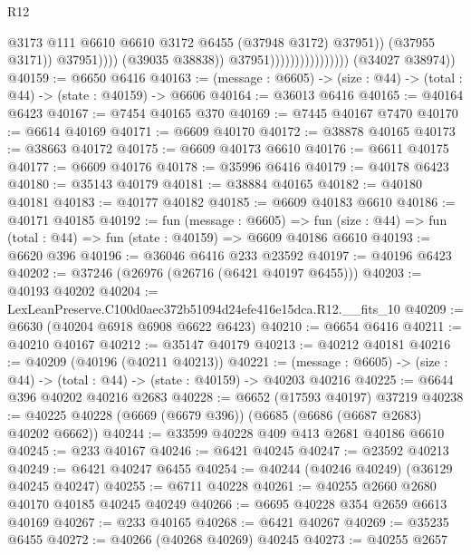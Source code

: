 \begin{lexlean}{R12}
\begin{coremodule}
                                                      @3173
                                                      @111
                                                      @6610
                                                      @6610
                                                      @3172
                                                      @6455
                                                      (@37948 @3172)
                                                      @37951))
                                                  (@37955 @3171))
                                                @37951))))
                                        (@39035 @38838))
                                      @37951))))))))))))))))
      (@34027 @38974))
@40159 := @6650 @6416
@40163 := (message : @6605) -> (size : @44) -> (total : @44) -> (state : @40159) -> @6606
@40164 := @36013 @6416
@40165 := @40164 @6423
@40167 := @7454 @40165 @370
@40169 := @7445 @40167 @7470
@40170 := @6614 @40169
@40171 := @6609 @40170
@40172 := @38878 @40165
@40173 := @38663 @40172
@40175 := @6609 @40173 @6610
@40176 := @6611 @40175
@40177 := @6609 @40176
@40178 := @35996 @6416
@40179 := @40178 @6423
@40180 := @35143 @40179
@40181 := @38884 @40165
@40182 := @40180 @40181
@40183 := @40177 @40182
@40185 := @6609 @40183 @6610
@40186 := @40171 @40185
@40192 := fun (message : @6605) =>
  fun (size : @44) => fun (total : @44) => fun (state : @40159) => @6609 @40186 @6610
@40193 := @6620 @396
@40196 := @36046 @6416 @233 @23592
@40197 := @40196 @6423
@40202 := @37246 (@26976 (@26716 (@6421 @40197 @6455)))
@40203 := @40193 @40202
@40204 := LexLeanPreserve.C100d0aec372b51094d24efe416e15dca.R12.__fits_10
@40209 := @6630 (@40204 @6918 @6908 @6622 @6423)
@40210 := @6654 @6416
@40211 := @40210 @40167
@40212 := @35147 @40179
@40213 := @40212 @40181
@40216 := @40209 (@40196 (@40211 @40213))
@40221 := (message : @6605) -> (size : @44) -> (total : @44) -> (state : @40159) -> @40203 @40216
@40225 := @6644 @396 @40202 @40216 @2683
@40228 := @6652 (@17593 @40197) @37219
@40238 := @40225 @40228 (@6669 (@6679 @396)) (@6685 (@6686 (@6687 @2683) @40202 @6662))
@40244 := @33599 @40228 @409 @413 @2681 @40186 @6610
@40245 := @233 @40167
@40246 := @6421 @40245
@40247 := @23592 @40213
@40249 := @6421 @40247 @6455
@40254 := @40244 (@40246 @40249) (@36129 @40245 @40247)
@40255 := @6711 @40228
@40261 := @40255 @2660 @2680 @40170 @40185 @40245 @40249
@40266 := @6695 @40228 @354 @2659 @6613 @40169
@40267 := @233 @40165
@40268 := @6421 @40267
@40269 := @35235 @6455
@40272 := @40266 (@40268 @40269) @40245
@40273 := @40255 @2657

\end{coremodule}
\end{lexlean}
